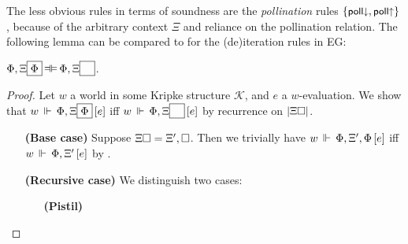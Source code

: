 The less obvious rules in terms of soundness are the \emph{pollination} rules
$\{\text{\small$\mathsf{poll{\downarrow}}$},\text{\small$\mathsf{poll{\uparrow}}$}\}$, because of the arbitrary context $\Xi$
and reliance on the pollination relation. The following lemma can be compared to
 for the (de)iteration rules in EG:

\begin{lemma}
  $\Phi, \Xi\select{\Phi} \kequiv \Phi, \Xi\select{\phantom{\Phi}}$.
\end{lemma}
\begin{proof}
  Let $w$ a world in some Kripke structure $\mathcal{K}$, and $e$ a
  $w$-evaluation. We show that $w\,\Vdash\,\Phi, \Xi\fbox{$\Phi$}\,[e]$ iff
  $w\,\Vdash\,\Phi, \Xi{\fbox{$\phantom{\Phi}$}}\,[e]$ by recurrence on
  $\left|\Xi\square\right|$.
  \begin{itemize}
    \item[\textbf{(Base case)}]
      Suppose $\Xi\square = \Xi', \square$. Then we trivially have
      $w\,\Vdash\,\Phi, \Xi', \Phi\,[e]$ iff $w\,\Vdash\,\Phi, \Xi'\,[e]$ by
      .
    \item[\textbf{(Recursive case)}]
      We distinguish two cases:
      \begin{itemize}
        \item[\textbf{(Pistil)}]
          \newcommand{\FillXi}[1]{\Xi', (\flower{\garden{\bx}{#1}}{\Delta})}
          \newcommand{\rFillXi}[1]{\flower{\garden{\bx}{#1}}{\Delta}}

          \newcommand{\fillXi}[1]{\FillXi{\Xi_0\select{#1}}}
          \newcommand{\rfillXi}[1]{\rFillXi{\Xi_0\select{#1}}}
          \newcommand{\ffillXi}[1]{\Xi\select{#1}}


\end{itemize}
\end{itemize}
\end{proof}
